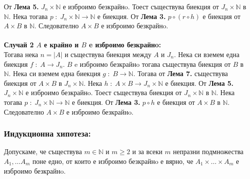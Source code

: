 \documentclass[a4paper, 12pt, oneside]{article}
\newcommand{\N}{\mathbb{N}}
\begin{document}
От \textbf{Лема 5.} \(J_n \times \N\) е изброимо безкрайнo.
Тоест съществува биекция от \(J_n\times \N\) в \(\N\).
Нека тогава \(p \; : \; J_n \times \N \to \N\) е биекция.
От \textbf{Лема 3.} \(p \circ (r \circ h)\) е биекция от \(A \times B\) в \(\N\).
Следователно \(A \times B\) е изброимо безкрайнo. \\
\hfill \\
\bigskip
\textbf{Случай 2 \(A\) е крайно и \(B\) e изброимо безкрайнo:} \\
Тогава нека \(n = |A|\) и съществува биекция между \(A\) и \(J_n\).
Нека си вземем една биекция \(f \; : \; A \to J_n\).
\(B\) e изброимо безкрайнo тогава съществува биекция от \(B\) в \(\N\).
Нека си вземем една биекция \(g \; : \; B \to \N\).
Тогава от \textbf{Лема 7.} съществува биекция от \(A \times B\) в \(J_n \times \N\).
Нека \(h \; : \; A \times B \to J_n \times \N\) е биекция.
От \textbf{Лема 5.} \(J_n \times \N\) е изброимо безкрайнo.
Тоест съществува биекция от \(J_n\times \N\) в \(\N\).
Нека тогава \(p \; : \; J_n \times \N \to \N\) е биекция.
От \textbf{Лема 3.} \(p \circ h\) е биекция от \(A \times B\) в \(\N\).
Следователно \(A \times B\) е изброимо безкрайнo.
\subsubsection*{Индукционна хипотеза:}
Допускаме, че съществува \(m \in \N\) и \(m \geq 2\)
и за всеки \(m\) непразни подмножества \(A_1, \dots A_m\)
поне едно, от които е изброимо безкрайнo е вярно,
че \(A_1 \times \dots \times A_m\) е изброимо безкрайнo. 
\end{document}
